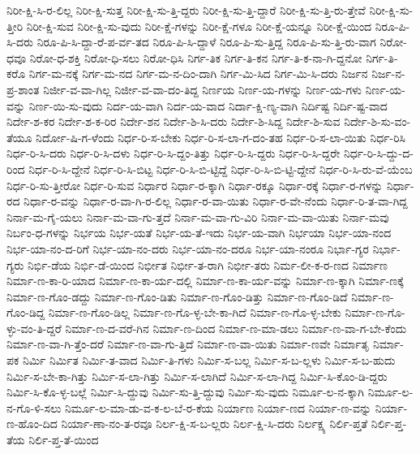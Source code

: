 {ನಿರೀ-ಕ್ಷಿ-ಸಿ-ರ-ಲಿಲ್ಲ
ನಿರೀ-ಕ್ಷಿ-ಸುತ್ತ
ನಿರೀ-ಕ್ಷಿ-ಸು-ತ್ತಿ-ದ್ದರು
ನಿರೀ-ಕ್ಷಿ-ಸು-ತ್ತಿ-ದ್ದಾರೆ
ನಿರೀ-ಕ್ಷಿ-ಸು-ತ್ತಿ-ರು-ತ್ತೇವೆ
ನಿರೀ-ಕ್ಷಿ-ಸು-ತ್ತೀರಿ
ನಿರೀ-ಕ್ಷಿ-ಸುವ
ನಿರೀ-ಕ್ಷಿ-ಸು-ವುದು
ನಿರೀ-ಕ್ಷೆ-ಗಳನ್ನು
ನಿರೀ-ಕ್ಷೆ-ಗಳೂ
ನಿರೀ-ಕ್ಷೆ-ಯನ್ನೂ
ನಿರೀ-ಕ್ಷೆ-ಯಿಂದ
ನಿರೂ-ಪಿ-ಸಿ-ದರು
ನಿರೂ-ಪಿ-ಸಿ-ದ್ದಾ-ರೆ-ಪ-ರ್ವ-ತದ
ನಿರೂ-ಪಿ-ಸಿ-ದ್ದಾಳೆ
ನಿರೂ-ಪಿ-ಸು-ತ್ತಿದ್ದ
ನಿರೂ-ಪಿ-ಸು-ತ್ತಿ-ರು-ವಾಗ
ನಿರೋ-ಧವೂ
ನಿರೋ-ಧ-ಶಕ್ತಿ
ನಿರೋ-ಧಿ-ಸಲು
ನಿರೋ-ಧಿಸಿ
ನಿರ್ಗ-ತಿಕ
ನಿರ್ಗ-ತಿ-ಕನ
ನಿರ್ಗ-ತಿ-ಕ-ನಾ-ಗಿ-ದ್ದನೋ
ನಿರ್ಗ-ತಿ-ಕರೊ
ನಿರ್ಗ-ಮ-ನಕ್ಕೆ
ನಿರ್ಗ-ಮ-ನದ
ನಿರ್ಗ-ಮ-ನ-ದಿಂ-ದಾಗಿ
ನಿರ್ಗ-ಮಿ-ಸಿದ
ನಿರ್ಗ-ಮಿ-ಸಿ-ದರು
ನಿರ್ಜನ
ನಿರ್ಜ-ನ-ಪ್ರ-ಶಾಂತ
ನಿರ್ಜೀ-ವ-ವಾ-ಗಿಲ್ಲ
ನಿರ್ಜೀ-ವ-ವಾ-ದಂ-ತಿದ್ದ
ನಿರ್ಣಯ
ನಿರ್ಣ-ಯ-ಗಳನ್ನು
ನಿರ್ಣ-ಯ-ಗಳು
ನಿರ್ಣ-ಯ-ವನ್ನು
ನಿರ್ಣ-ಯಿ-ಸು-ವುದು
ನಿರ್ದ-ಯ-ವಾಗಿ
ನಿರ್ದ-ಯ-ವಾದ
ನಿರ್ದಾ-ಕ್ಷಿ-ಣ್ಯ-ವಾಗಿ
ನಿರ್ದಿಷ್ಟ
ನಿರ್ದಿ-ಷ್ಟ-ವಾದ
ನಿರ್ದೇ-ಶ-ಕರ
ನಿರ್ದೇ-ಶ-ಕ-ರಿರ
ನಿರ್ದೇ-ಶನ
ನಿರ್ದೇ-ಶಿ-ಸಿ-ದರು
ನಿರ್ದೇ-ಶಿ-ಸಿದ್ದ
ನಿರ್ದೇ-ಶಿ-ಸುವ
ನಿರ್ದೇ-ಶಿ-ಸು-ವಂ-ತೆಯೂ
ನಿರ್ದೋ-ಷಿ-ಗ-ಳೆಂದು
ನಿರ್ಧ-ರಿ-ಸ-ಬೇಕು
ನಿರ್ಧ-ರಿ-ಸ-ಲಾ-ಗ-ದಂ-ತಹ
ನಿರ್ಧ-ರಿ-ಸ-ಲಾ-ಯಿತು
ನಿರ್ಧ-ರಿಸಿ
ನಿರ್ಧ-ರಿ-ಸಿ-ದರು
ನಿರ್ಧ-ರಿ-ಸಿ-ದಳು
ನಿರ್ಧ-ರಿ-ಸಿ-ದ್ದಂ-ತಿತ್ತು
ನಿರ್ಧ-ರಿ-ಸಿ-ದ್ದರು
ನಿರ್ಧ-ರಿ-ಸಿ-ದ್ದರೇ
ನಿರ್ಧ-ರಿ-ಸಿ-ದ್ದು-ದ-ರಿಂದ
ನಿರ್ಧ-ರಿ-ಸಿ-ದ್ದೇನೆ
ನಿರ್ಧ-ರಿ-ಸಿ-ಬಿಟ್ಟ
ನಿರ್ಧ-ರಿ-ಸಿ-ಬಿ-ಟ್ಟಿದ್ದೆ
ನಿರ್ಧ-ರಿ-ಸಿ-ಬಿ-ಟ್ಟಿ-ದ್ದೇನೆ
ನಿರ್ಧ-ರಿ-ಸಿ-ರು-ವೆ-ಯೆಂಬ
ನಿರ್ಧ-ರಿ-ಸು-ತ್ತೀರೋ
ನಿರ್ಧ-ರಿ-ಸುವ
ನಿರ್ಧಾರ
ನಿರ್ಧಾ-ರ-ಕ್ಕಾಗಿ
ನಿರ್ಧಾ-ರಕ್ಕೂ
ನಿರ್ಧಾ-ರಕ್ಕೆ
ನಿರ್ಧಾ-ರ-ಗಳನ್ನು
ನಿರ್ಧಾ-ರದ
ನಿರ್ಧಾ-ರ-ವನ್ನು
ನಿರ್ಧಾ-ರ-ವಾ-ಗಿ-ರ-ಲಿಲ್ಲ
ನಿರ್ಧಾ-ರ-ವಾ-ಯಿತು
ನಿರ್ಧಾ-ರ-ವೇ-ನೆಂದು
ನಿರ್ಧಾ-ರಿ-ತ-ವಾ-ಗಿದ್ದ
ನಿರ್ನಾ-ಮ-ಗೈ-ಯಲು
ನಿರ್ನಾ-ಮ-ವಾ-ಗು-ತ್ತದೆ
ನಿರ್ನಾ-ಮ-ವಾ-ಗು-ವಿರಿ
ನಿರ್ನಾ-ಮ-ವಾ-ಯಿತು
ನಿರ್ನಾ-ಮವು
ನಿರ್ಬಂ-ಧ-ಗಳನ್ನು
ನಿರ್ಭಯ
ನಿರ್ಭ-ಯತೆ
ನಿರ್ಭ-ಯ-ತೆ-ಇದು
ನಿರ್ಭ-ಯ-ವಾಗಿ
ನಿರ್ಭಯಾ
ನಿರ್ಭ-ಯಾ-ನಂದ
ನಿರ್ಭ-ಯಾ-ನಂ-ದ-ರಿಗೆ
ನಿರ್ಭ-ಯಾ-ನಂ-ದರು
ನಿರ್ಭ-ಯಾ-ನಂ-ದರೂ
ನಿರ್ಭ-ಯಾ-ನಂರೂ
ನಿರ್ಭಾ-ಗ್ಯರ
ನಿರ್ಭಾ-ಗ್ಯರು
ನಿರ್ಭಿ-ಡೆಯ
ನಿರ್ಭಿ-ಡೆ-ಯಿಂದ
ನಿರ್ಭೀತ
ನಿರ್ಭೀ-ತ-ರಾಗಿ
ನಿರ್ಭೀ-ತರು
ನಿರ್ಮ-ಲೀ-ಕ-ರ-ಣದ
ನಿರ್ಮಾಣ
ನಿರ್ಮಾ-ಣ-ಕಾ-ರಿ-ಯಾದ
ನಿರ್ಮಾ-ಣ-ಕಾ-ರ್ಯ-ದಲ್ಲಿ
ನಿರ್ಮಾ-ಣ-ಕಾ-ರ್ಯ-ವನ್ನು
ನಿರ್ಮಾ-ಣ-ಕ್ಕಾಗಿ
ನಿರ್ಮಾ-ಣಕ್ಕೆ
ನಿರ್ಮಾ-ಣ-ಗೊಂ-ಡದ್ದು
ನಿರ್ಮಾ-ಣ-ಗೊಂ-ಡಿತು
ನಿರ್ಮಾ-ಣ-ಗೊಂ-ಡಿತ್ತು
ನಿರ್ಮಾ-ಣ-ಗೊಂ-ಡಿದೆ
ನಿರ್ಮಾ-ಣ-ಗೊಂ-ಡಿದ್ದ
ನಿರ್ಮಾ-ಣ-ಗೊಂ-ಡಿಲ್ಲ
ನಿರ್ಮಾ-ಣ-ಗೊ-ಳ್ಳ-ಬೇ-ಕಾ-ಗಿದೆ
ನಿರ್ಮಾ-ಣ-ಗೊ-ಳ್ಳ-ಬೇಕು
ನಿರ್ಮಾ-ಣ-ಗೊ-ಳ್ಳು-ವಂ-ತಿ-ದ್ದರೆ
ನಿರ್ಮಾ-ಣ-ದ-ವರೆ-ಗಿನ
ನಿರ್ಮಾ-ಣ-ದಿಂದ
ನಿರ್ಮಾ-ಣ-ಮಾ-ಡಲು
ನಿರ್ಮಾ-ಣ-ವಾ-ಗ-ಬೇ-ಕೆಂದು
ನಿರ್ಮಾ-ಣ-ವಾ-ಗಿ-ತ್ತೆಂ-ದರೆ
ನಿರ್ಮಾ-ಣ-ವಾ-ಗು-ತ್ತಿದೆ
ನಿರ್ಮಾ-ಣ-ವಾ-ಯಿತು
ನಿರ್ಮಾ-ಣವೇ
ನಿರ್ಮಾತೃ
ನಿರ್ಮಾ-ಪಕ
ನಿರ್ಮಿ
ನಿರ್ಮಿತ
ನಿರ್ಮಿ-ತ-ವಾದ
ನಿರ್ಮಿ-ತಿ-ಗಳು
ನಿರ್ಮಿ-ಸ-ಬಲ್ಲ
ನಿರ್ಮಿ-ಸ-ಬ-ಲ್ಲಳು
ನಿರ್ಮಿ-ಸ-ಬ-ಹುದು
ನಿರ್ಮಿ-ಸ-ಬೇ-ಕಾ-ಗಿತ್ತು
ನಿರ್ಮಿ-ಸ-ಲಾ-ಗಿತ್ತು
ನಿರ್ಮಿ-ಸ-ಲಾಗಿದೆ
ನಿರ್ಮಿ-ಸ-ಲಾ-ಗಿದ್ದ
ನಿರ್ಮಿ-ಸಿ-ಕೊಂ-ಡಿ-ದ್ದರು
ನಿರ್ಮಿ-ಸಿ-ಕೊ-ಳ್ಳ-ಬಲ್ಲೆ
ನಿರ್ಮಿ-ಸಿ-ದ್ದುವು
ನಿರ್ಮಿ-ಸು-ತ್ತಿ-ದ್ದುವು
ನಿರ್ಮಿ-ಸು-ವುದು
ನಿರ್ಮೂ-ಲ-ನ-ಕ್ಕಾಗಿ
ನಿರ್ಮೂ-ಲ-ನ-ಗೊ-ಳಿ-ಸಲು
ನಿರ್ಮೂ-ಲ-ಮಾ-ಡು-ವ-ಕ-ಲ-ಬೆ-ರ-ಕೆಯ
ನಿರ್ಯಾಣ
ನಿರ್ಯಾ-ಣದ
ನಿರ್ಯಾ-ಣ-ವನ್ನು
ನಿರ್ಯಾ-ಣ-ಹೊಂ-ದಿದ
ನಿರ್ಯಾ-ಣಾ-ನಂ-ತ-ರವೂ
ನಿರ್ಲ-ಕ್ಷಿ-ಸ-ಬ-ಲ್ಲರು
ನಿರ್ಲ-ಕ್ಷಿ-ಸಿ-ದರು
ನಿರ್ಲಕ್ಷ್ಯ
ನಿರ್ಲಿ-ಪ್ತತೆ
ನಿರ್ಲಿ-ಪ್ತ-ತೆಯ
ನಿರ್ಲಿ-ಪ್ತ-ತೆ-ಯಿಂದ
}

